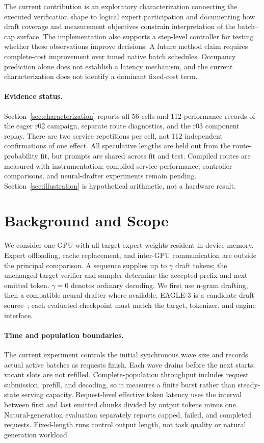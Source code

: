\documentclass[10pt,twocolumn]{article}
\begin{document}
The current contribution is an exploratory characterization connecting the executed verification shape to logical expert participation and documenting how draft coverage and measurement objectives constrain interpretation of the batch--cap surface. The implementation also supports a step-level controller for testing whether these observations improve decisions. A future method claim requires complete-cost improvement over tuned native batch schedules. Occupancy prediction alone does not establish a latency mechanism, and the current characterization does not identify a dominant fixed-cost term.

\paragraph{Evidence status.} Section~\ref{sec:characterization} reports all 56 cells and 112 performance records of the eager r02 campaign, separate route diagnostics, and the r03 component replay. There are two service repetitions per cell, not 112 independent confirmations of one effect. All speculative lengths are held out from the route-probability fit, but prompts are shared across fit and test. Compiled routes are measured with instrumentation; compiled service performance, controller comparisons, and neural-drafter experiments remain pending. Section~\ref{sec:illustration} is hypothetical arithmetic, not a hardware result.

\section{Background and Scope}
We consider one GPU with all target expert weights resident in device memory. Expert offloading, cache replacement, and inter-GPU communication are outside the principal comparison. A sequence supplies up to $\gamma$ draft tokens; the unchanged target verifier and sampler determine the accepted prefix and next emitted token. $\gamma=0$ denotes ordinary decoding. We first use n-gram drafting, then a compatible neural drafter where available. EAGLE-3 is a candidate draft source~\cite{eagle3,eaglerepo}; each evaluated checkpoint must match the target, tokenizer, and engine interface.

\paragraph{Time and population boundaries.} The current experiment controls the initial synchronous wave size and records actual active batches as requests finish. Each wave drains before the next starts; vacant slots are not refilled. Complete-population throughput includes request submission, prefill, and decoding, so it measures a finite burst rather than steady-state serving capacity. Request-level effective token latency uses the interval between first and last emitted chunks divided by output tokens minus one. Natural-generation evaluation separately reports capped, failed, and completed requests. Fixed-length runs control output length, not task quality or natural generation workload.
\end{document}
